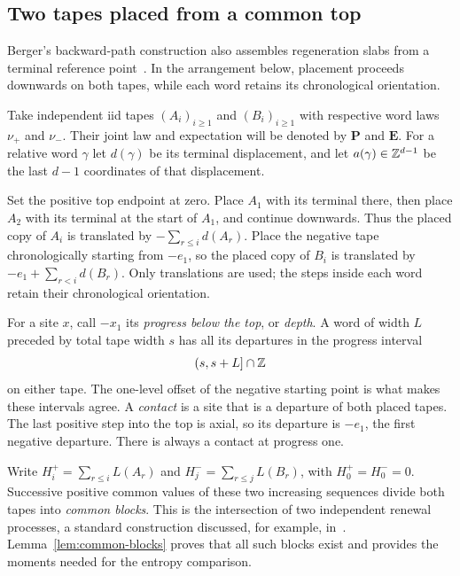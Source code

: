 \subsection{Two tapes placed from a common top}

Berger's backward-path construction also assembles regeneration slabs
from a terminal reference point~\cite[Sections~2--3]{Berger2008}. In the
arrangement below, placement proceeds downwards on both tapes, while
each word retains its chronological orientation.

Take independent iid tapes $(A_i)_{i\ge1}$ and $(B_i)_{i\ge1}$
with respective word laws $\nu_+$ and $\nu_-$.
Their joint law and expectation will be denoted by $\mathbf P$
and $\mathbf E$.  For a relative word $\gamma$ let $d(\gamma)$
be its terminal displacement, and let $a(\gamma)\in\mathbb Z^{d-1}$
be the last $d-1$ coordinates of that displacement.

Set the positive top endpoint at zero.  Place $A_1$ with its
terminal there, then place $A_2$ with its terminal at the start of
$A_1$, and continue downwards.  Thus the placed copy of $A_i$ is
translated by $-\sum_{r\le i}d(A_r)$.  Place the negative tape
chronologically starting from $-e_1$, so the placed copy of $B_i$
is translated by $-e_1+\sum_{r<i}d(B_r)$.
Only translations are used; the steps inside each word retain
their chronological orientation.

For a site $x$, call $-x_1$ its \emph{progress below the top}, or \emph{depth}.
A word of width $L$ preceded by total tape width $s$ has all its
departures in the progress interval
\begin{equation}\label{eq:departure-progress}
 (s,s+L]\cap\mathbb Z
\end{equation}
on either tape.  The one-level offset of the negative starting
point is what makes these intervals agree.  A \emph{contact} is
a site that is a departure of both placed tapes.  The last positive
step into the top is axial, so its departure is $-e_1$, the first
negative departure.  There is always a contact at progress one.

Write $H_i^+=\sum_{r\le i}L(A_r)$ and
$H_j^-=\sum_{r\le j}L(B_r)$, with $H_0^+=H_0^-=0$.
Successive positive common values of these two increasing
sequences divide both tapes into \emph{common blocks}.
This is the intersection of two independent renewal processes, a standard
construction discussed, for example, in~\cite{AlexanderBerger2016}.
Lemma~\ref{lem:common-blocks} proves that all such blocks exist and provides the moments
needed for the entropy comparison.

